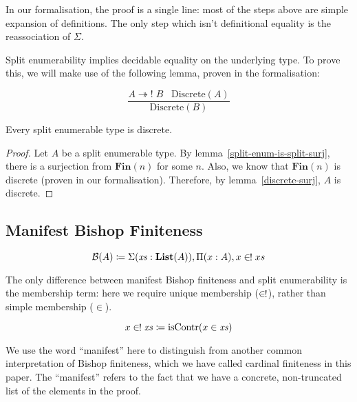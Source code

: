 In our formalisation, the proof is a single line: most of the steps above are
simple expansion of definitions.
The only step which isn't definitional equality is the reassociation of
\(\Sigma\).

Split enumerability implies decidable equality on the underlying type.
To prove this, we will make use of the following lemma, proven in the
formalisation:
\begin{lemma} \label{discrete-surj}
  \begin{equation}
    \frac{
        A \twoheadrightarrow! \; B \; \; \; \text{Discrete}(A)
      }{
       \text{Discrete}(B) 
      }
  \end{equation}
\end{lemma}
\begin{lemma} \label{split-enum-discrete}
  Every split enumerable type is discrete.
\end{lemma}
\begin{proof}
  Let \(A\) be a split enumerable type.
  By lemma~\ref{split-enum-is-split-surj}, there is a surjection from
  \(\mathbf{Fin}(n)\) for some \(n\).
  Also, we know that \(\mathbf{Fin}(n)\) is discrete (proven in our
  formalisation).
  Therefore, by lemma~\ref{discrete-surj}, \(A\) is discrete.
\end{proof}
\subsection{Manifest Bishop Finiteness}
\begin{definition}
  \begin{equation} \label{bish-def}
    \mathcal{B}(A) \coloneqq \Sigma {(\mathit{xs} : \textbf{List}(A))} , \Pi {(x : A)} , x \inunique xs
  \end{equation}
\end{definition}
The only difference between manifest Bishop finiteness and split enumerability
is the membership term: here we require unique membership (\(\inunique\)),
rather than simple membership (\(\in\)).
\begin{definition} \label{uniq-memb-def}
  \begin{equation}
    x \inunique \mathit{xs} \coloneqq \text{isContr}(x \in \mathit{xs})
  \end{equation}
\end{definition}

We use the word ``manifest'' here to distinguish from another common
interpretation of Bishop finiteness, which we have called cardinal finiteness in
this paper.
The ``manifest'' refers to the fact that we have a concrete, non-truncated list
of the elements in the proof.

